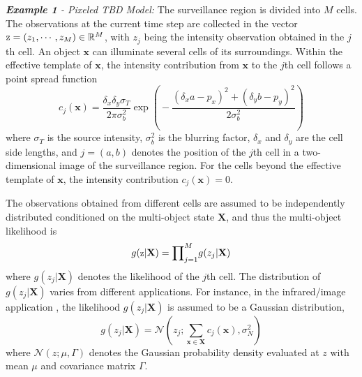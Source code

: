 \documentclass[journal]{IEEEtran}
\newcommand{\bX}{{\mathbf X}}
\newcommand{\bx}{{\mathbf x}}
\begin{document}
{\noindent \textit{\textbf{Example 1} - Pixeled TBD Model: }
The surveillance
region is divided into $M$ cells. The observations at the current time step  are collected in
the vector $\textmd{z}=(z_1,\cdots,z_M)\in \mathbb{R}^M$, with $z_j$ being the intensity
observation obtained in the $j$th cell. An object $\bx$ can  illuminate several cells of its surroundings.
Within the effective template of $\bx$,
   the intensity contribution from $\bx$ to the $j$th cell follows a point spread function \cite{refr:beyond_kalm_filer}  
\begin{equation}\label{The point spread function}
c_j(\bx)=\frac{\delta_x\delta_y\sigma_T}{2\pi\sigma^2_b}\!\exp\!\left(\!-\frac{(\delta_x a-p_x)^2+(\delta_y b-p_y)^2}{2\sigma^2_b}\right)
\end{equation}
  where $\sigma_T$ is the source intensity, $\sigma^2_b$ is the blurring factor, $\delta_x$ and $\delta_y$ are the cell side lengths, and $j=(a,b)$ denotes the position of the $j$th cell in a two-dimensional image of the surveillance region.  For the cells beyond the  effective template of $\bx$, the intensity contribution $c_j(\bx)=0$.
  
 The  observations obtained from different cells
are assumed to be independently distributed conditioned on the multi-object state $\bX$, and thus the multi-object likelihood is\begin{equation}
{\small\label{likelihood-multiobject}
g(\textmd{z}|\bX)={\prod}_{j=1}^M g(z_j|\bX)} \end{equation}
where $g(z_j|\bX)$ denotes the likelihood of the $j$th cell.
The distribution of $g(z_{j}|\bX)$ varies from different applications. For instance, in the infrared/image application  
\cite{refr:MeMber_filter,refr:beyond_kalm_filer}, 
the likelihood $g(z_j|\bX)$ is assumed to be a Gaussian distribution, 
\begin{equation}\label{eq:TBD}
  g(z_j|\bX)=\mathcal{N}\left(z_j;{\sum}_{\bx\in \bX}c_j(\bx),\sigma^2_N\right)
\end{equation}
where $\mathcal{N}(z;\mu,\Gamma)$ denotes the Gaussian probability density
evaluated at $z$ with mean $\mu$ and covariance matrix $\Gamma$.
  


}
\end{document}
